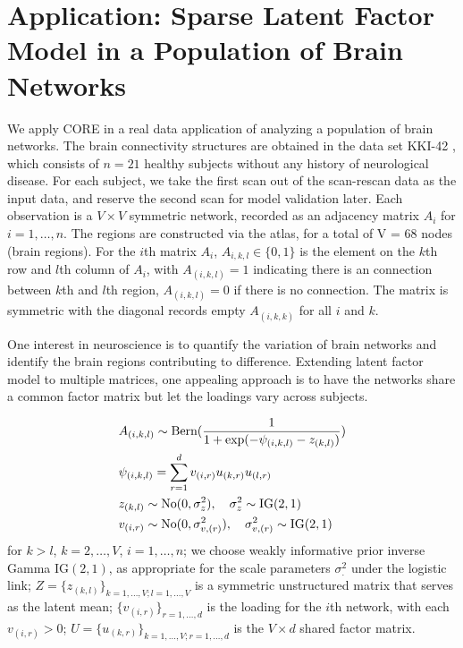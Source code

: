 \documentclass[10pt,fleqn]{article}
\DeclareMathOperator{\1}{\mathbbm{1}} \DeclareMathOperator{\bigO}{\mc O}
\begin{document}
\section{Application: Sparse Latent Factor Model in a Population of Brain Networks}

We apply CORE in a real data application of analyzing a population of brain
networks. The brain connectivity structures are obtained in the data set
KKI-42 \citep{landman2011multi}, which consists of $n=21$ healthy subjects
without any history of neurological disease. For each subject, we take the
first scan out of the scan-rescan data as the input data, and reserve the
second scan for model validation later. Each observation is a $V\times V$
symmetric network, recorded as an adjacency matrix $A_i$ for
$i=1,\ldots,n$. The regions are constructed via the
\cite{desikan2006automated} atlas, for a total of V = 68 nodes (brain regions).  For the $i$th matrix
$A_i$, $A_{i,k,l} \in \{0,1\}$ is the element on the $k$th row and $l$th
column of $A_i$, with $A_{(i,k,l)}=1$ indicating there is an connection
between $k$th and $l$th region, $A_{(i,k,l)}=0$ if there is no connection.
The matrix is symmetric with the diagonal records empty $A_{(i,k,k)}$ for
all $i$ and $k$.

One interest in neuroscience is to quantify the variation of
brain networks and identify the brain regions contributing to difference.
Extending latent factor model to multiple matrices, one appealing approach is
to have the networks share a common factor matrix but let the loadings
vary across subjects.

\begin{equation*} \begin{aligned}
& A_{(i,k,l)} \sim \text{Bern}( \frac{1}{1+ \exp(-\psi_{(i,k,l)}-
z_{(k,l)})})                                                             \\ & \psi_{(i,k,l)} = \sum_{r=1}^{d}  v_{(i,r)} u_{(k,r)}
u_{(l,r)}                                                                \\
& z_{(k,l)} \sim \operatorname{No}(0,\sigma^2_z),\quad  \sigma^2_z\sim \text{IG}(2,1) \\
& v_{(i,r)} \sim \operatorname{No}(0,\sigma^2_{v,(r)}), \quad
\sigma^2_{v,(r)} \sim \text{IG}(2,1)
\end{aligned} \end{equation*}
for
$k>l$, $k=2,\ldots, V$, $i=1,\ldots,n$;  we choose weakly informative prior inverse
Gamma $\text{IG}(2,1)$, as appropriate for the scale parameters $\sigma^2_.$ under the logistic
link; $Z=\{z_{(k,l)}\}_{k=1,\ldots,V;l=1,\ldots,V}$ is a symmetric unstructured
matrix that serves as the latent mean; $\{ v_{(i,r)}\}_{r=1,\ldots,d}$ is
the loading for the $i$th network, with each $v_{(i,r)}>0$; $U=\{ u_{(k,r)}\}_{ k=1,\ldots,V;r=1,\ldots,d}$ is the $V\times d$ shared factor matrix.
\end{document}

